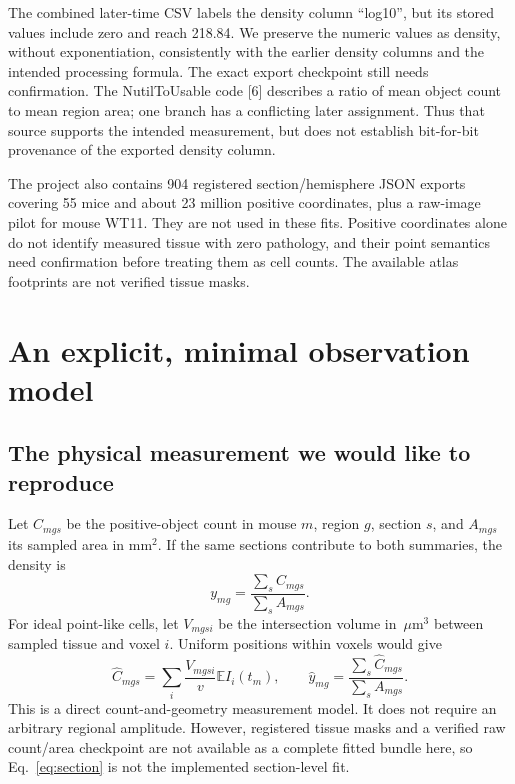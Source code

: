 \documentclass[10pt]{article}
\newcommand{\um}{\,\mu\mathrm{m}}\newcommand{\E}{\mathbb{E}}
\begin{document}
The combined later-time CSV labels the density column ``log10'', but its stored values include zero and reach 218.84. We preserve the numeric values as density, without exponentiation, consistently with the earlier density columns and the intended processing formula. The exact export checkpoint still needs confirmation. The NutilToUsable code [6] describes a ratio of mean object count to mean region area; one branch has a conflicting later assignment. Thus that source supports the intended measurement, but does not establish bit-for-bit provenance of the exported density column.

The project also contains 904 registered section/hemisphere JSON exports covering 55 mice and about 23 million positive coordinates, plus a raw-image pilot for mouse WT11. They are not used in these fits. Positive coordinates alone do not identify measured tissue with zero pathology, and their point semantics need confirmation before treating them as cell counts. The available atlas footprints are not verified tissue masks.

\newpage
\section{An explicit, minimal observation model}
\subsection{The physical measurement we would like to reproduce}
Let $C_{mgs}$ be the positive-object count in mouse $m$, region $g$, section $s$, and $A_{mgs}$ its sampled area in mm$^2$. If the same sections contribute to both summaries, the density is
\begin{equation}
 y_{mg}=\frac{\sum_s C_{mgs}}{\sum_s A_{mgs}}.
\end{equation}
For ideal point-like cells, let $V_{mgsi}$ be the intersection volume in $\um^3$ between sampled tissue and voxel $i$. Uniform positions within voxels would give
\begin{equation}
 \widehat C_{mgs}=\sum_i\frac{V_{mgsi}}{v}\E I_i(t_m),\qquad
 \widehat y_{mg}=\frac{\sum_s\widehat C_{mgs}}{\sum_s A_{mgs}}.\label{eq:section}
\end{equation}
This is a direct count-and-geometry measurement model. It does not require an arbitrary regional amplitude. However, registered tissue masks and a verified raw count/area checkpoint are not available as a complete fitted bundle here, so Eq.~\ref{eq:section} is not the implemented section-level fit.
\end{document}
